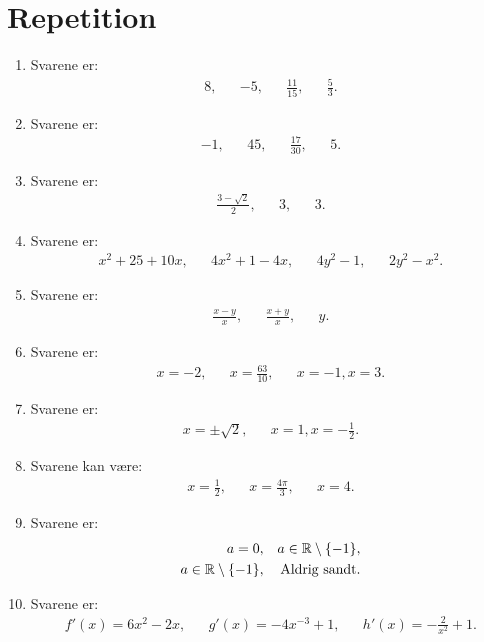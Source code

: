 \section{Repetition}
\begin{enumerate}
	\item Svarene er:
	\begin{align*}
	8,&& -5,&& \frac{11}{15},&& \frac{5}{3}.
	\end{align*}
	
	\item Svarene er:
	\begin{align*}
	-1,&& 45,&&\frac{17}{30},&& 5.
	\end{align*}
	
	\item Svarene er:
	\begin{align*}
	\frac{3-\sqrt{2}}{2},&& 3,&& 3.
	\end{align*}
	
	\item Svarene er:
	\begin{align*}
	x^2+25+10x,&& 4x^2+1-4x,&& 4y^2-1,&& 2y^2-x^2.
	\end{align*}
	
	\item Svarene er:
	\begin{align*}
	\frac{x-y}{x},&& \frac{x+y}{x},&& y.
	\end{align*}
	
	\item Svarene er:
	\begin{align*}
	x=-2,&& x=\frac{63}{10},&&x=-1, x=3.
	\end{align*}
	
	\item Svarene er:
	\begin{align*}
	x=\pm \sqrt{2},&& x=1,x=-\frac{1}{2}.
	\end{align*}
	
	\item Svarene kan være:
	\begin{align*}
	x=\frac{1}{2},&& x=\frac{4\pi}{3},&& x=4.
	\end{align*}
	
	\item Svarene er:
	\begin{align*}
	a=0,&& a\in \mathbb{R}\setminus\{-1\},\\
	a\in \mathbb{R}\setminus\{-1\},&& \textup{Aldrig sandt}.
	\end{align*}
	
	\item Svarene er:
	\begin{align*}
	f'(x)=6x^2-2x,&& g'(x)=-4x^{-3}+1,&& h'(x)=-\frac{2}{x^{2}}+1.
	\end{align*}
	

\end{enumerate}
